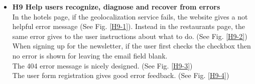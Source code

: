 \begin{itemize}
\begin{figure}[!ht]
            \begin{minipage}{\linewidth}
                \centering
                \captionsetup{justification=centering}
                \caption{}
                \label{H8-1}
            \end{minipage}
        \end{figure}
        \begin{figure}[!ht]
            \begin{minipage}{\linewidth}
                \centering
                \captionsetup{justification=centering}
                \caption{}
                \label{H8-2}
            \end{minipage}
        \end{figure}
    \item \textbf{H9 Help users recognize, diagnose and recover from errors}\\
        In the hotels page, if the geolocalization service fails, the website gives a not helpful error message (See Fig. \ref{H9-1}). Instead in the restaurants page, the same error gives to the user instructions about what to do. (See Fig. \ref{H9-2})\\
        When signing up for the newsletter, if the user first checks the checkbox then no error is shown for leaving the email field blank.\\
        The 404 error message is nicely designed. (See Fig. \ref{H9-3})\\
        The user form registration gives good error feedback. (See Fig. \ref{H9-4})
        \begin{figure}[!ht]

\end{figure}
\end{itemize}
